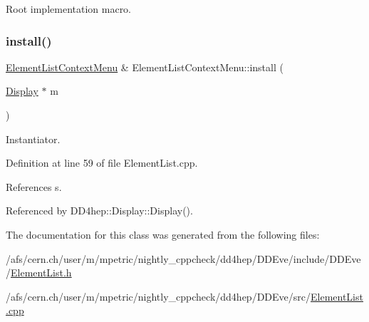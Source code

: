 Root implementation macro. 

\hypertarget{class_d_d4hep_1_1_element_list_context_menu_aa7cb9b95de9a2e5ff1b4a152de62cd79}{}\label{class_d_d4hep_1_1_element_list_context_menu_aa7cb9b95de9a2e5ff1b4a152de62cd79} 
\subsubsection{\texorpdfstring{install()}{install()}}
{\footnotesize\ttfamily \hyperlink{class_d_d4hep_1_1_element_list_context_menu}{Element\+List\+Context\+Menu} \& Element\+List\+Context\+Menu\+::install (\begin{DoxyParamCaption}\item[{\hyperlink{class_d_d4hep_1_1_display}{Display} $\ast$}]{m }\end{DoxyParamCaption})\hspace{0.3cm}{\ttfamily [static]}}



Instantiator. 



Definition at line 59 of file Element\+List.\+cpp.



References s.



Referenced by D\+D4hep\+::\+Display\+::\+Display().



The documentation for this class was generated from the following files\+:\begin{DoxyCompactItemize}
\item 
/afs/cern.\+ch/user/m/mpetric/nightly\+\_\+cppcheck/dd4hep/\+D\+D\+Eve/include/\+D\+D\+Eve/\hyperlink{_element_list_8h}{Element\+List.\+h}\item 
/afs/cern.\+ch/user/m/mpetric/nightly\+\_\+cppcheck/dd4hep/\+D\+D\+Eve/src/\hyperlink{_element_list_8cpp}{Element\+List.\+cpp}\end{DoxyCompactItemize}
